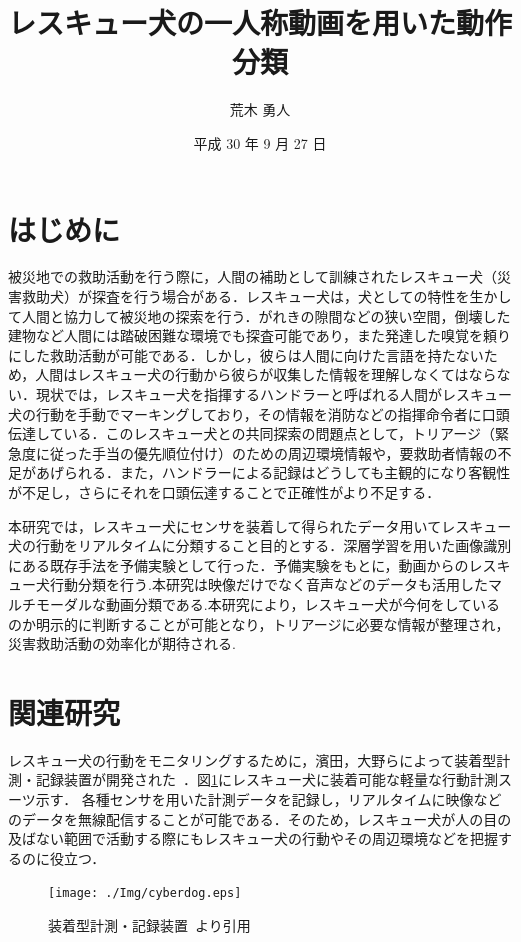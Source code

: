 \documentclass[twocolumn, a4paper]{UECIEresume}
\title{レスキュー犬の一人称動画を用いた動作分類}
\date{平成 30 年 9 月 27 日}
\affiliation{情報学専攻 メディア情報学 プログラム}
\author{荒木 勇人}
\begin{document}
\maketitle

\section{はじめに}
被災地での救助活動を行う際に，人間の補助として訓練されたレスキュー犬（災害救助犬）が探査を行う場合がある．レスキュー犬は，犬としての特性を生かして人間と協力して被災地の探索を行う．がれきの隙間などの狭い空間，倒壊した建物など人間には踏破困難な環境でも探査可能であり，また発達した嗅覚を頼りにした救助活動が可能である．しかし，彼らは人間に向けた言語を持たないため，人間はレスキュー犬の行動から彼らが収集した情報を理解しなくてはならない．現状では，レスキュー犬を指揮するハンドラーと呼ばれる人間がレスキュー犬の行動を手動でマーキングしており，その情報を消防などの指揮命令者に口頭伝達している．このレスキュー犬との共同探索の問題点として，トリアージ（緊急度に従った手当の優先順位付け）のための周辺環境情報や，要救助者情報の不足があげられる．また，ハンドラーによる記録はどうしても主観的になり客観性が不足し，さらにそれを口頭伝達することで正確性がより不足する．

本研究では，レスキュー犬にセンサを装着して得られたデータ用いてレスキュー犬の行動をリアルタイムに分類すること目的とする．深層学習を用いた画像識別にある既存手法を予備実験として行った．予備実験をもとに，動画からのレスキュー犬行動分類を行う.本研究は映像だけでなく音声などのデータも活用したマルチモーダルな動画分類である.本研究により，レスキュー犬が今何をしているのか明示的に判断することが可能となり，トリアージに必要な情報が整理され，災害救助活動の効率化が期待される.

\section{関連研究}

レスキュー犬の行動をモニタリングするために，濱田，大野らによって装着型計測・記録装置が開発された~\cite{dog01}．図\ref{cyber}にレスキュー犬に装着可能な軽量な行動計測スーツ示す． 各種センサを用いた計測データを記録し，リアルタイムに映像などのデータを無線配信することが可能である．そのため，レスキュー犬が人の目の及ばない範囲で活動する際にもレスキュー犬の行動やその周辺環境などを把握するのに役立つ．
\begin{figure}[htbp]
 \begin{center}
  \texttt{[image: ./Img/cyberdog.eps]}
  \caption{装着型計測・記録装置~\cite{dog01}より引用}
  \label{cyber}
 \end{center}
\end{figure}
\end{document}
